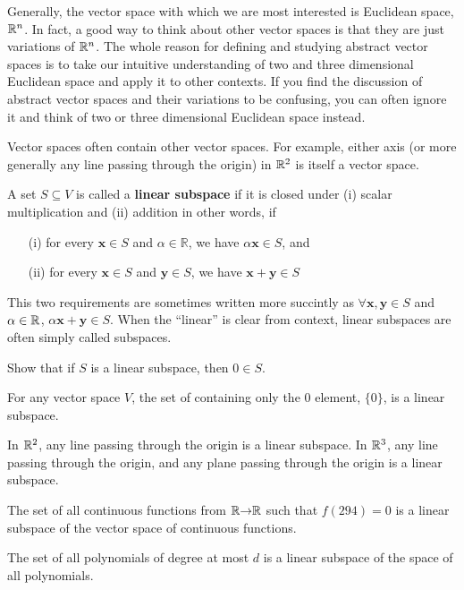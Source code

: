 Generally, the vector space with which we are most interested is
Euclidean space, $\mathbb{R}^n$. In fact, a good way to think about other
vector spaces is that they are just variations of $\mathbb{R}^n$. The whole
reason for defining and studying abstract vector spaces is to take our
intuitive understanding of two and three dimensional Euclidean space
and apply it to other contexts. If you find the discussion of abstract
vector spaces and their variations to be confusing, you can often
ignore it and think of two or three dimensional Euclidean space
instead.

Vector spaces often contain other vector spaces. For example, either
axis (or more generally any line passing through the origin) in $\mathbb{R}^2$
is itself a vector space.  
\begin{definition}
  A set $S \subseteq V$ is called a \textbf{linear
    subspace} if it is closed under (i) scalar multiplication and (ii)
  addition in other words, if 
  \begin{itemize}
  \item[(i)] for every $\mathbf{x} \in S$ and $\alpha \in \mathbb{R}$,
    we have $\alpha \mathbf{x} \in S$, and
  \item[(ii)] for every $\mathbf{x} \in S$ and $\mathbf{y} \in
    S$, we have
    $\mathbf{x} + \mathbf{y} \in S$
  \end{itemize}
\end{definition}
This two requirements are sometimes written more succintly as $\forall
\mathbf{x}, \mathbf{y} \in S$ and $\alpha \in \mathbb{R}$, $\alpha \mathbf{x}
+ \mathbf{y} \in S$. When the ``linear'' is clear from context, linear
subspaces are often simply called subspaces. 
\begin{exercise}
  Show that if $S$ is a linear subspace, then $0 \in S$. 
\end{exercise}
\begin{example}
  For any vector space $V$, the set of containing only the $0$
  element, $\{0\}$, is a linear subspace.
\end{example}
\begin{example}
  In $\mathbb{R}^2$, any line passing through the origin is a linear subspace.
  In $\mathbb{R}^3$, any line passing through the origin, and any plane
  passing through the origin is a linear subspace.
\end{example}
\begin{example}
  The set of all continuous functions from $\mathbb{R} {\rightarrow} \mathbb{R}$ such that
  $f(294) = 0$ is a linear subspace of the vector space of continuous
  functions. 
\end{example}
\begin{example}
  The set of all polynomials of degree at most $d$ is a linear
  subspace of the space of all polynomials.  
\end{example}

